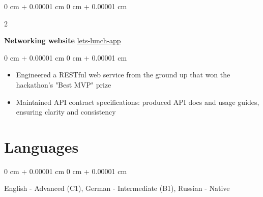 \documentclass[10pt, letterpaper]{article}
\newenvironment{highlights}{
    \begin{itemize}[
        topsep=0.10 cm,
        parsep=0.10 cm,
        partopsep=0pt,
        itemsep=0pt,
        leftmargin=0 cm + 10pt
    ]
}{
    \end{itemize}
} %
\newenvironment{onecolentry}{
    \begin{adjustwidth}{
        0 cm + 0.00001 cm
    }{
        0 cm + 0.00001 cm
    }
}{
    \end{adjustwidth}
} %
\newenvironment{twocolentry}[2][]{
    \onecolentry
    \def\secondColumn{#2}
    \setcolumnwidth{\fill, 4.5 cm}
    \begin{paracol}{2}
}{
    \switchcolumn \raggedleft \secondColumn
    \end{paracol}
    \endonecolentry
} %
\begin{document}
        \vspace{0.2 cm}

        \begin{twocolentry}{
        \href{https://github.com/elizavetakotelnikova/Let-s-lunch-app}{lets-lunch-app}
        }
            \textbf{Networking website} \end{twocolentry}

        \vspace{0.20 cm}
        \begin{onecolentry}
            \begin{highlights}
                \item Engineered a RESTful web service from the ground up that won the hackathon's "Best MVP" prize
                \item Maintained API contract specifications: produced API docs and usage guides, ensuring clarity and consistency
            \end{highlights}
        \end{onecolentry}
\section{Languages}
            \begin{onecolentry}
                English - Advanced (C1), German - Intermediate (B1), Russian - Native
        \end{onecolentry}
    
\end{document}
